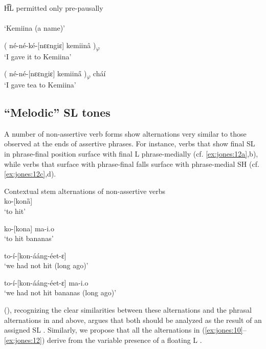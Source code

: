 \documentclass[output=paper
,newtxmath
,modfonts
,nonflat]{langsci/langscibook}
\begin{document}
\ea\label{ex:jones:11}
{\label{bkm:Ref359198007}H͡L permitted only pre-pausally \citep[252]{Roberts-Kohno2000}}\\
\ea\label{ex:jones:11a}
 \\
\glt   ‘Kemiina (a name)’

\ex\label{ex:jones:11b}
{( né-né-ké-[nɛɛngiɛ] kemiinâ )\textsubscript{$\varphi $}}\\
\glt ‘I gave it to Kemiina’    

\ex\label{ex:jones:11c}
{\label{bkm:Ref359197637}( né-né-[nɛɛngiɛ] kemiin\H{a} )\textsubscript{$\varphi $} cháí}\\
\glt ‘I gave tea to Kemiina’  
\z
\z

\subsection{“Melodic” SL tones}
\label{bkm:Ref359196276}
A number of non-assertive verb forms show alternations very similar to those observed at the ends of assertive phrases. For instance, verbs that show final SL in phrase-final position surface with final L phrase-medially (cf. \ref{ex:jones:12a},b), while verbs that surface with phrase-final falls surface with phrase-medial SH (cf. \ref{ex:jones:12c},d).

\ea\label{ex:jones:12}
{\label{bkm:Ref359198070}Contextual stem alternations of non-assertive verbs} \\
\ea\label{ex:jones:12a}
{\label{bkm:Ref359197862}ko-[konȁ]} \\
\glt ‘to hit’

\ex\label{ex:jones:12b}
{\label{bkm:Ref359197870}ko-[kona] ma-i.o}\\
\glt ‘to hit bananas’

\ex\label{ex:jones:12c}
{\label{bkm:Ref359197948}to-í-[kon-ááng-éet-ɛ]}\\
\glt ‘we had not hit (long ago)’

\ex\label{ex:jones:12d}
{\label{bkm:Ref359197953}to-í-[kon-ááng-éet-ɛ] ma-i.o} \\
\glt ‘we had not hit bananas (long ago)’
\z
\z

\citeauthor{Roberts-Kohno2000} (\citeyear{Roberts-Kohno2000,Roberts-Kohno2014}), recognizing the clear similarities between these alternations and the phrasal alternations in  and  above, argues that both should be analyzed as the result of an assigned SL . Similarly, we propose that all the alternations in (\ref{ex:jones:10}--\ref{ex:jones:12}) derive from the variable presence of a floating L .
\end{document}

